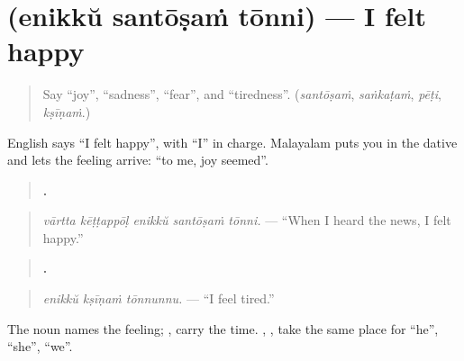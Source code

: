 \section[\texorpdfstring{\ml{എനിക്ക്} \ml{സന്തോഷം} \ml{തോന്നി} (enikkŭ santōṣaṁ …)}{എനിക്ക് സന്തോഷം തോന്നി (enikkŭ santōṣaṁ …)}]{   (enikkŭ santōṣaṁ tōnni) — I felt happy}

\label{lesson:ML-C345-santosham-tonni}



\begin{quote}
Say \textquotedblleft{}joy\textquotedblright{}, \textquotedblleft{}sadness\textquotedblright{}, \textquotedblleft{}fear\textquotedblright{}, and \textquotedblleft{}tiredness\textquotedblright{}. (\emph{santōṣaṁ}, \emph{saṅkaṭaṁ}, \emph{pēṭi}, \emph{kṣīṇaṁ}.)
\end{quote}

\begin{grammarlens}[title={Grammar Lens: the feeling comes to you}]
English says \textquotedblleft{}I felt happy\textquotedblright{}, with \textquotedblleft{}I\textquotedblright{} in charge. Malayalam puts you in the dative and lets the feeling arrive: \textquotedblleft{}to me, joy seemed\textquotedblright{}.

\begin{quote}
\textbf{    .}
\end{quote}

\begin{quote}
\emph{vārtta kēṭṭappōḷ enikkŭ santōṣaṁ tōnni.} — \textquotedblleft{}When I heard the news, I felt happy.\textquotedblright{}
\end{quote}

\begin{quote}
\textbf{  .}
\end{quote}

\begin{quote}
\emph{enikkŭ kṣīṇaṁ tōnnunnu.} — \textquotedblleft{}I feel tired.\textquotedblright{}
\end{quote}

The noun names the feeling; \textbf{}, \textbf{} carry the time. \textbf{}, \textbf{}, \textbf{} take the same place for \textquotedblleft{}he\textquotedblright{}, \textquotedblleft{}she\textquotedblright{}, \textquotedblleft{}we\textquotedblright{}.
\end{grammarlens}

